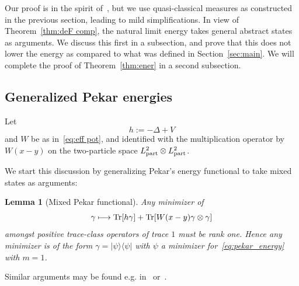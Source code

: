 \documentclass[10pt]{amsart}
\newtheorem{lemm}[theo]{Lemma}\newtheorem{prop}[theo]{Proposition}\newtheorem{coro}[theo]{Corollary}\newtheorem{conj}[theo]{Conjecture}
\theoremstyle{definition}\newtheorem{defi}[theo]{Definition}\newtheorem{rema}[theo]{Remark}\newtheorem{exam}[theo]{Example}\newtheorem{exem}[theo]{Example}\newtheorem{nota}[theo]{Notation}
\DeclareMathOperator{\Tr}{Tr}
\newcommand{\1}{\mathds{1}}
\let\oldmapsto\mapsto
\renewcommand*{\mapsto}{\mathchoice{\longmapsto}{\oldmapsto}{\oldmapsto}{\oldmapsto}}
\let\originalleft\left
\let\originalright\right
\renewcommand{\left}{\mathopen{}\mathclose\bgroup\originalleft}
\renewcommand{\right}{\aftergroup\egroup\originalright}
\begin{document}
Our proof is in the spirit of~\cite{CorFalOli-20}, but we use quasi-classical measures as constructed in the previous section, leading to mild simplifications. In view of Theorem~\ref{thm:deF comp}, the natural limit energy takes general abstract states as arguments. We discuss this first in a subsection, and prove that this does not lower the energy as compared to what was defined in Section~\ref{sec:main}. We will complete the proof of Theorem~\ref{thm:ener} in a second subsection.

\subsection{Generalized Pekar energies}

Let
\begin{equation*}
h:=-\Delta + V
\end{equation*}
and $W$ be as in~\eqref{eq:eff pot}, and identified with the multiplication operator by $W(x-y)$ on the two-particle space $L^2_{\rm part} \otimes L^2_{\rm part}$.

We start this discussion by generalizing Pekar's energy functional to take mixed states as arguments:

\begin{lemm}[{Mixed Pekar functional}]\label{lem:mixed pek}
Any minimizer of
\begin{equation*}
\gamma \mapsto \Tr\left[h \gamma \right] + \Tr \left[W(x-y) \gamma \otimes \gamma \right]
\end{equation*}
amongst positive trace-class operators of trace $1$ must be rank one. Hence any minimizer is of the form $\gamma = |\psi \rangle \langle \psi|$ with $\psi$ a minimizer for~\eqref{eq:pekar_energy} with $m=1$.
\end{lemm}

Similar arguments may be found e.g. in~\cite[Section~5]{Seiringer-02} or~\cite[Section~2]{BauSei-01}.
\end{document}
